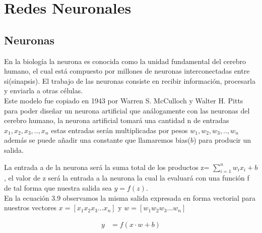 \section{Redes Neuronales}
\subsection{Neuronas}
En la biología la neurona es conocida como la unidad fundamental del cerebro humano, el cual está compuesto por millones de neuronas interconectadas entre si(sinapsis). El trabajo de las neuronas consiste en recibir información, procesarla y enviarla a otras células.\\ Este modelo fue copiado en 1943 por Warren S. McCulloch y Walter H. Pitts para poder diseñar un neurona artificial que análogamente con las neuronas del cerebro humano, la neurona artificial tomará una cantidad n de entradas $x_{1}, x_{2}, x_{3}, .. , x_{n}$ estas entradas serán multiplicadas por pesos $w_{1}, w_{2}, w_{3}, .. , w_{n}$ además se puede añadir una constante que llamaremos bias($b$) para producir un salida.

La entrada a de la neurona será la suma total de los productos z=  $\sum_{i=1}^{n}{ w_{i}x_{i}}+b$ , el valor de z será la entrada a la neurona la cual la evaluará con una función f de tal forma que nuestra salida sea $y=f(z)$.\\ En la ecuación 3.9 observamos la misma salida expresada en forma vectorial para nuestros vectores  $x = [x_{1}  x_{2}  x_{3}  ...  x_{n}]$ y $w = [w_{1}  w_{2}  w_{3}  ...  w_{n}]$



\begin{equation}
\label{forma vectorial}
\begin{aligned}
y&=f(x\cdot w+b)
\end{aligned}
\end{equation}
